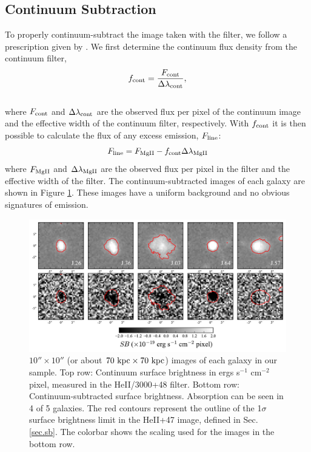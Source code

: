 \documentclass[trackchanges,twocolumn]{aastex62}
\begin{document}
\subsection{Continuum Subtraction}\label{subsec.cont_sub}

To properly continuum-subtract the image taken with the  filter, we follow a prescription given by \cite{Battaia_2015}. 
We first determine the continuum flux density from the continuum filter,
\begin{equation}
f_{\rm{cont}}=\frac{F_{\rm{cont}}}{\Delta \lambda_{\rm{cont}}},
\end{equation}\\
where $F_{\rm{cont}}$ and $\Delta \lambda_{\rm{cont}}$ are the observed flux per pixel of the continuum image and the effective width of the continuum filter, respectively. With $f_{\rm cont}$ it is then possible to calculate the flux of any excess emission, $F_{\rm{line}}$:
\begin{equation}
F_{\rm{line}}=F_{\rm{MgII}}-f_{\rm{cont}} \Delta \lambda_{\rm{MgII}}
\label{eq:subtraction}
\end{equation}
where $F_{\rm{MgII}}$ and $\Delta \lambda_{\rm MgII}$ are the observed flux per pixel in the  filter and the effective width of the  filter. The continuum-subtracted images of each galaxy are shown in Figure \ref{fig:stamp_images}. %
These
images have a uniform background and no obvious signatures of emission.

\begin{figure}[!htb]
\centering
\includegraphics[scale=0.7]{figure5.pdf}%
\caption{ $10'' \times 10''$ (or about $70 \rm \ kpc \times 70 \rm \ kpc $) images of each galaxy in our sample. Top row: Continuum surface brightness in ergs s$^{-1}$ cm$^{-2}$ pixel, measured in the HeII/3000+48 filter. Bottom row: Continuum-subtracted  surface brightness.  Absorption can be seen in 4 of 5 galaxies. The red contours represent the outline of the 1$\sigma$ surface brightness limit in the HeII+47 image, defined in Sec. \ref{sec.sb}. The colorbar shows the scaling used for the  images in the bottom row.}
\label{fig:stamp_images}
\end{figure}
\end{document}
